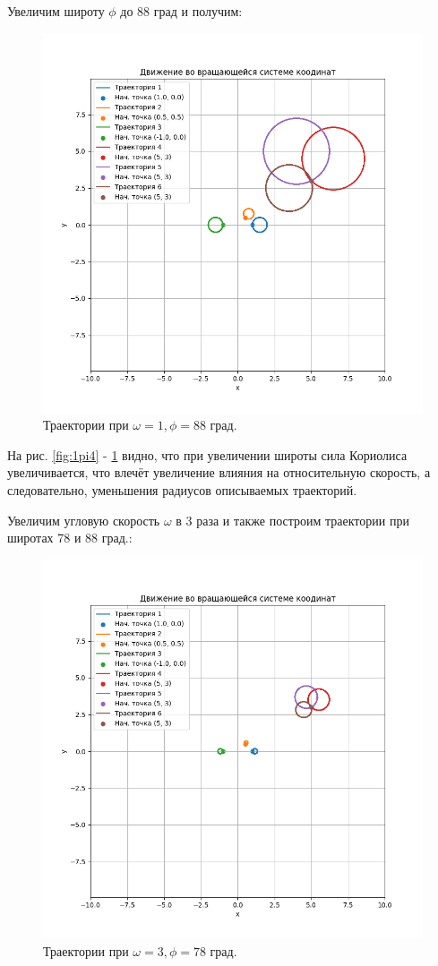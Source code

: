 Увеличим  широту $\phi$ до 88 град и получим: 
\begin{figure}[h]  %
	\centering
	\includegraphics[height=0.8\textwidth]{imgs/1_88.png}  %
	\caption{Траектории при \(\omega = 1, \phi = 88\) град.}  %
	\label{fig:1pi2.5}  %
\end{figure}

На рис. \ref{fig:1pi4} - \ref{fig:1pi2.5} видно, что при увеличении широты сила Кориолиса увеличивается, что влечёт увеличение влияния на относительную скорость, а следовательно, уменьшения радиусов описываемых траекторий.

Увеличим угловую скорость $\omega$ в 3 раза и также построим траектории при широтах 78 и 88 град.:
\begin{figure}[h]  %
	\centering
	\includegraphics[height=0.7\textwidth]{imgs/3_78.png}  %
	\caption{Траектории при \(\omega = 3, \phi = 78\) град.}  %
	\label{fig:10pi4}  %
\end{figure}


